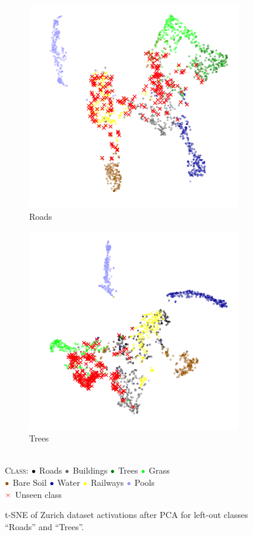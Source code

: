 \documentclass[10pt]{article}
\newcommand{\legendBullet}{
    \textsc{Class}: 
    ${\color{black}\bullet}$ Roads
    ${\color{buildings}\bullet}$ Buildings
    ${\color{trees}\bullet}$ Trees
    ${\color{grass}\bullet}$ Grass\\
    ${\color{baresoil}\bullet}$ Bare Soil
    ${\color{water}\bullet}$ Water
    ${\color{railways}\bullet}$ Railways
    ${\color{swimmingpools}\bullet}$ Pools\\
    ${\color{unseen}\times}$ Unseen class
    }
\begin{document}
\begin{figure}[H]
    \centering
    \begin{subfigure}{.49\textwidth}
        \centering
        \includegraphics[width=\textwidth]{t-SNE_wo_cl1_after_PCA}
        \caption{Roads}
    \end{subfigure}
    \begin{subfigure}{.5\textwidth}
        \centering
        \includegraphics[width=\textwidth]{t-SNE_wo_cl3_after_PCA}
        \caption{Trees}
    \end{subfigure}
    \\[.2cm]
    \legendBullet
    \caption{\gls{t-SNE} of Zurich dataset activations after \gls{PCA} for left-out classes ``Roads'' and ``Trees''.}
    \label{fig:tsne-zurich-miscl}
\end{figure}
\end{document}
